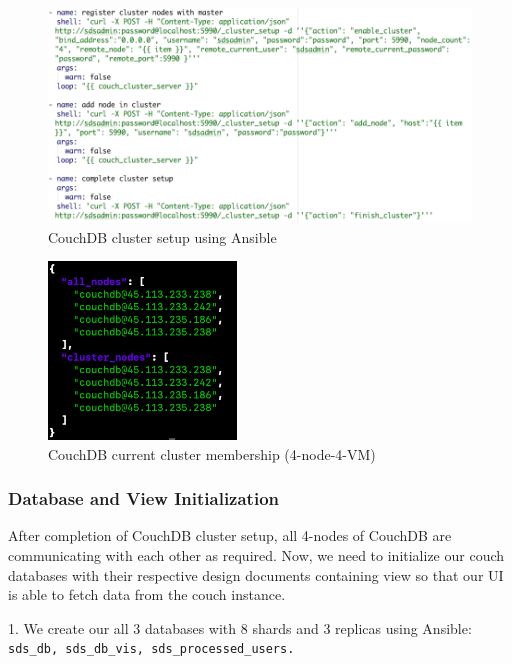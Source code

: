 \begin{figure}[H]
    \centering
    \includegraphics[width=12cm,keepaspectratio=true]{images/deployment/couch_cluster_setup.png}
    \caption{CouchDB cluster setup using Ansible}
    \label{fig:couchinstallation3}
\end{figure}

\begin{figure}[H]
    \centering
    \includegraphics[width=5cm,keepaspectratio=true]{images/deployment/couchdb_cluster.png}
    \caption{CouchDB current cluster membership (4-node-4-VM)}
    \label{fig:couchinstallation4}
\end{figure}

\subsubsection{Database and View Initialization}
After completion of CouchDB cluster setup, all 4-nodes of CouchDB are communicating with each other as required. Now, we need to initialize our couch databases with their respective design documents containing view so that our UI is able to fetch data from the couch instance.

1. We create our all 3 databases with 8 shards and 3 replicas using Ansible: \texttt{sds\_db, sds\_db\_vis, sds\_processed\_users.}

